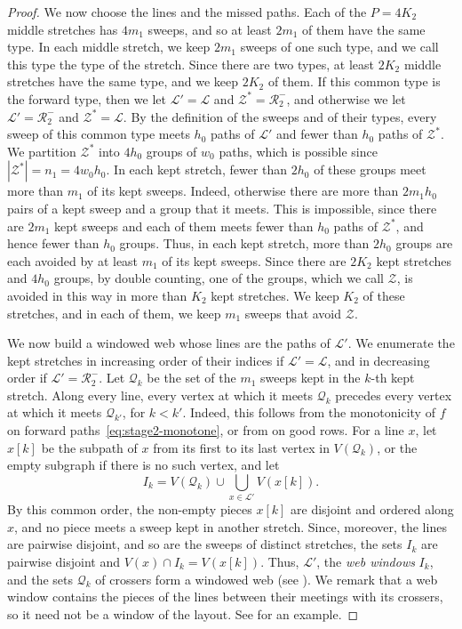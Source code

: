 \documentclass[fontsize=12pt,leading=14pt]{fullpaper}
\newcommand{\Lcal}{\mathcal{L}}
\newcommand{\Qcal}{\mathcal{Q}}
\newcommand{\Rcal}{\mathcal{R}}
\newcommand{\Zcal}{\mathcal{Z}}
\begin{document}
\begin{proof}
  We now choose the lines and the missed paths.
  Each of the $P=4K_2$ middle stretches has $4m_1$ sweeps, and so at least $2m_1$ of them have the same type.
  In each middle stretch, we keep $2m_1$ sweeps of one such type, and we call this type the type of the stretch.
  Since there are two types, at least $2K_2$ middle stretches have the same type, and we keep $2K_2$ of them.
  If this common type is the forward type, then we let $\Lcal'=\Lcal$ and $\Zcal^*=\Rcal_2^-$, and otherwise we let $\Lcal'=\Rcal_2^-$ and $\Zcal^*=\Lcal$.
  By the definition of the sweeps and of their types, every sweep of this common type meets $h_0$ paths of $\Lcal'$ and fewer than $h_0$ paths of $\Zcal^*$.
  We partition $\Zcal^*$ into $4h_0$ groups of $w_0$ paths, which is possible since $|\Zcal^*|=n_1=4w_0h_0$.
  In each kept stretch, fewer than $2h_0$ of these groups meet more than $m_1$ of its kept sweeps.
  Indeed, otherwise there are more than $2m_1h_0$ pairs of a kept sweep and a group that it meets.
  This is impossible, since there are $2m_1$ kept sweeps and each of them meets fewer than $h_0$ paths of $\Zcal^*$, and hence fewer than $h_0$ groups.
  Thus, in each kept stretch, more than $2h_0$ groups are each avoided by at least $m_1$ of its kept sweeps.
  Since there are $2K_2$ kept stretches and $4h_0$ groups, by double counting, one of the groups, which we call $\Zcal$, is avoided in this way in more than $K_2$ kept stretches.
  We keep $K_2$ of these stretches, and in each of them, we keep $m_1$ sweeps that avoid $\Zcal$.

  We now build a windowed web whose lines are the paths of $\Lcal'$.
  We enumerate the kept stretches in increasing order of their indices if $\Lcal'=\Lcal$, and in decreasing order if $\Lcal'=\Rcal_2^-$.
  Let $\Qcal_k$ be the set of the $m_1$ sweeps kept in the $k$-th kept stretch.
  Along every line, every vertex at which it meets $\Qcal_k$ precedes every vertex at which it meets $\Qcal_{k'}$, for $k<k'$.
  Indeed, this follows from the monotonicity of $f$ on forward paths~\eqref{eq:stage2-monotone}, or from  on good rows.
  For a line $x$, let $x[k]$ be the subpath of $x$ from its first to its last vertex in $V(\Qcal_k)$, or the empty subgraph if there is no such vertex, and let
  \[
    I_k=V(\Qcal_k)\cup\bigcup_{x\in\Lcal'}V(x[k]).
  \]
  By this common order, the non-empty pieces $x[k]$ are disjoint and ordered along $x$, and no piece meets a sweep kept in another stretch.
  Since, moreover, the lines are pairwise disjoint, and so are the sweeps of distinct stretches, the sets $I_k$ are pairwise disjoint and $V(x)\cap I_k=V(x[k])$.
  Thus, $\Lcal'$, the \emph{web windows} $I_k$, and the sets $\Qcal_k$ of crossers form a windowed web (see ).
  We remark that a web window contains the pieces of the lines between their meetings with its crossers, so it need not be a window of the layout.
  See  for an example.


\end{proof}
\end{document}
